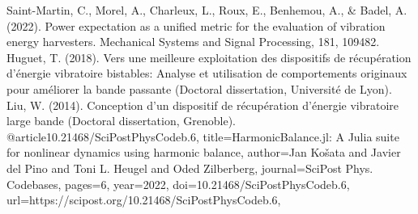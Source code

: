 \documentclass[a4paper, french, 12pt, titlepage]{article}
\begin{document}
Saint-Martin, C., Morel, A., Charleux, L., Roux, E., Benhemou, A., \& Badel, A. (2022). Power expectation as a unified metric for the evaluation of vibration energy harvesters. Mechanical Systems and Signal Processing, 181, 109482.\\

Huguet, T. (2018). Vers une meilleure exploitation des dispositifs de récupération d’énergie vibratoire bistables: Analyse et utilisation de comportements originaux pour améliorer la bande passante (Doctoral dissertation, Université de Lyon).\\

Liu, W. (2014). Conception d'un dispositif de récupération d'énergie vibratoire large bande (Doctoral dissertation, Grenoble).\\


@article{10.21468/SciPostPhysCodeb.6,
	title={{HarmonicBalance.jl: A Julia suite for nonlinear dynamics using harmonic  balance}},
	author={Jan Košata and Javier del Pino and Toni L. Heugel and Oded Zilberberg},
	journal={SciPost Phys. Codebases},
	pages={6},
	year={2022},
	doi={10.21468/SciPostPhysCodeb.6},
	url={https://scipost.org/10.21468/SciPostPhysCodeb.6},
}

	
\end{document}
